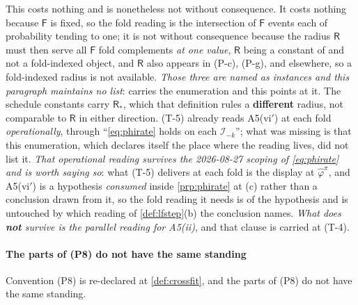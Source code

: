 This costs nothing and is nonetheless not without consequence. It costs nothing because $\mathsf F$
is fixed, so the fold reading is the intersection of $\mathsf F$ events each of probability tending to one;
it is not without consequence because the radius $\mathsf R$ must then serve all $\mathsf F$ fold
complements \emph{at one value}, $\mathsf R$ being a constant of  and not a fold-indexed
object, and $\mathsf R$ also appears in (P-c), (P-g),  and elsewhere, so a
fold-indexed radius is not available. \emph{Those three are named as instances and this paragraph
maintains no list}:  carries the enumeration and this points at it. The
schedule constants carry $\mathsf R_\ast$, which that definition rules a \textbf{different} radius,
not comparable to $\mathsf R$ in either direction. (T-5) already reads
A5(vi$'$) at each fold \emph{operationally}, through ``\eqref{eq:phirate} holds on each
$\mathcal I_{-k}$''; what was missing is that this enumeration, which declares itself the place where
the reading lives, did not list it. \emph{That operational reading survives the 2026-08-27 scoping of
\eqref{eq:phirate} and is worth saying so}: what (T-5) delivers at each fold is the display at
$\hat\varphi^{\pi}$, and A5(vi$'$) is a hypothesis \emph{consumed} inside \cref{prp:phirate} at
(c) rather than a conclusion drawn from it, so the fold reading it needs is of
the hypothesis and is untouched by which reading of \cref{def:lfstep}\textup{(b)} the conclusion names.
\emph{What does \textbf{not} survive is the parallel reading for A5(ii)}, and that clause is carried at
\textup{(T-4)}.


\paragraph{The parts of \textup{(P8)} do not have the same standing}

Convention \textup{(P8)} is re-declared at \cref{def:crossfit}, and the parts of
\textup{(P8)} do not have the same standing.

